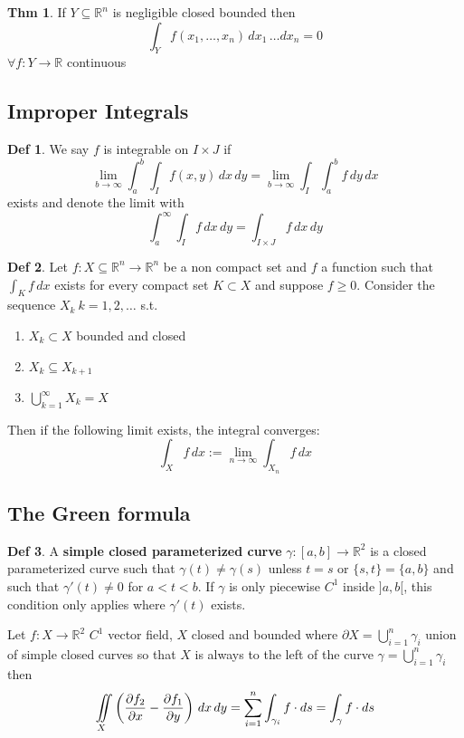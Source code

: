 \documentclass[a4paper, 10pt]{article}
\theoremstyle{definition}
\newtheorem*{theorem}{Thm}
\newtheorem*{definition}{Def}
\newcommand{\R}{\mathbb{R}}
\begin{document}
\begin{theorem}
    If \(Y \subseteq \R^n\) is negligible closed bounded then
    \[\int_Y f(x_1, \ldots, x_n) \, dx_1 \, \ldots dx_n = 0\]
    \(\forall f: Y \to \R\) continuous
\end{theorem}

\subsection{Improper Integrals}
\begin{definition}
    We say \(f\) is integrable on \(I \times J\) if
    \[\lim_{b \to \infty} \int_a^b \int_I f(x, y) \,dx \,dy = \lim_{b \to \infty} \int_I \int_a^b f \, dy \, dx\]
    exists and denote the limit with
    \[\int_a^\infty \int_I f \,dx \,dy = \int_{I \times J} f \,dx \,dy\]
\end{definition}

\begin{definition}
    Let \(f: X \subseteq \R^n \to \R^n\) be a non compact set and \(f\) a function such that \(\int_K f \, dx\) exists for every compact set \(K \subset X\) and suppose \(f \geq 0\). Consider the sequence \(X_k \ k = 1, 2, \ldots\) s.t.
    \begin{enumerate}
        \item \(X_k \subset X\) bounded and closed
        \item \(X_k \subseteq X_{k+1}\)
        \item \(\bigcup_{k=1}^\infty X_k = X\)
    \end{enumerate}
    Then if the following limit exists, the integral converges:
    \[\int_X f \, dx := \lim_{n\to\infty} \int_{X_n}f \, dx\]
\end{definition}

\subsection{The Green formula}

\begin{definition}
    A \textbf{simple closed parameterized curve} \(\gamma:[a, b] \to \R^2\) is a closed parameterized curve such that \(\gamma(t) \neq \gamma(s)\) unless \(t = s\) or \(\{s, t\} = \{a, b\}\) and such that \(\gamma'(t) \neq 0\) for \(a < t < b\). If \(\gamma\) is only piecewise \(C^1\) inside \(]a, b[\), this condition only applies where \(\gamma'(t)\) exists.
\end{definition}

\begin{ntheorem*}
    Let \(f: X \to \R^2\) \(C^1\) vector field, \(X\) closed and bounded where \(\partial X = \bigcup_{i = 1}^n \gamma_i\) union of simple closed curves so that \(X\)  is always to the left of the curve \(\gamma = \bigcup_{i = 1}^n \gamma_i\) then
    \[\iint\displaylimits_{X} \left(\frac{\partial f_2}{\partial x} - \frac{\partial f_1}{\partial y}\right) \, dx \, dy = \sum_{i =1}^n \int_{\gamma_i} f \cdot ds = \int_\gamma f \cdot ds\]
\end{ntheorem*}
\end{document}

